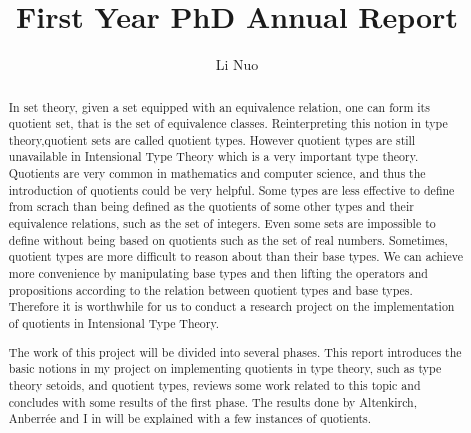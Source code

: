 \documentclass{article}
\author{Li Nuo}
\title{First Year PhD Annual Report}
\theoremstyle{definition}
\newcommand{\todo}[1]{\textcolor{red}{TO~DO:~#1}}
\newcommand{\itt}{Intensional Type Theory}
\begin{document}
\maketitle

\tableofcontents

\newpage

\begin{abstract}



In set theory, given a set equipped with an equivalence relation, one can form its
quotient set, that is the set of equivalence classes.
Reinterpreting this notion in type theory,quotient sets are called quotient types.
However quotient types are still
unavailable in \itt{} which is a very important type theory.
Quotients are very common in mathematics and computer science, and
thus the introduction of quotients could be very helpful.
Some types are less effective to define from scrach than being defined
as the quotients of some other types and their equivalence relations, such as the
set of integers.
Even some sets are impossible to define without being based on quotients such as the set of real
numbers.
Sometimes, quotient types are more difficult to reason about than
their base types. 
We can achieve more convenience by manipulating base types and then lifting the operators and propositions according to the relation between quotient types and base types.
Therefore it is worthwhile for us to conduct a research project on the
implementation of quotients in \itt{}.

The work of this project will be divided into several phases. This
report introduces the basic notions in my project on implementing
quotients in type theory, such as type theory setoids, and quotient
types, reviews some work related to this topic and concludes with some
results of the first phase. 
The results done by Altenkirch, Anberr\'{e}e and I in \cite{aan} will be explained with a
few instances of quotients.

\end{abstract}
\end{document}
